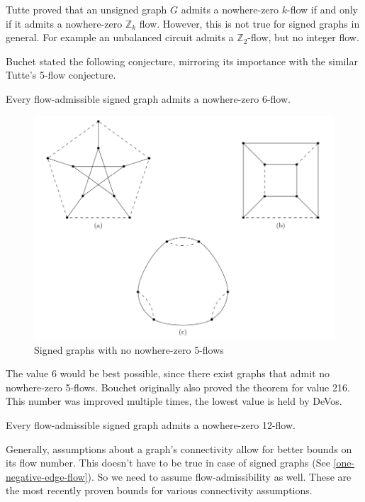Tutte\cite{tutte-proof} proved that an unsigned graph $G$ admits a nowhere-zero $k$-flow if and only if it admits a nowhere-zero $\mathbb{Z}_k$ flow. 
However, this is not true for signed graphs in general. For example an unbalanced circuit admits a $\mathbb{Z}_2$-flow, but no integer flow.

Buchet stated the following conjecture, mirroring its importance with the similar Tutte's 5-flow conjecture.

\begin{conjecture}
    Every flow-admissible signed graph admits a nowhere-zero 6-flow.
\end{conjecture}

\begin{figure}[ht]\label{fig:no-5-flow}
    \centering
    \includegraphics[scale=0.65]{images/petersen-no-5.png}
    \caption{Signed graphs with no nowhere-zero 5-flows}
\end{figure}

The value 6 would be best possible, since there exist graphs that admit no nowhere-zero 5-flows.
Bouchet originally also proved the theorem for value 216. This number was improved multiple times, 
the lowest value is held by DeVos\cite{devos}.

\begin{theorem}[DeVos]
    Every flow-admissible signed graph admits a nowhere-zero 12-flow.
\end{theorem}

Generally, assumptions about a graph's connectivity allow for better bounds on its flow number.
This doesn't have to be true in case of signed graphs (See \cref{one-negative-edge-flow}). 
So we need to assume flow-admissibility as well. These are the most recently proven bounds for various connectivity assumptions.

